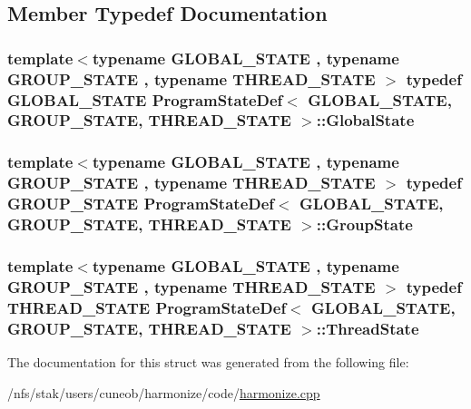\subsection{Member Typedef Documentation}
\hypertarget{structProgramStateDef_a8f9d3005b6690c9ed965e42d5c5bb21f}{
\subsubsection[{Global\-State}]{\setlength{\rightskip}{0pt plus 5cm}template$<$typename G\-L\-O\-B\-A\-L\-\_\-\-S\-T\-A\-T\-E , typename G\-R\-O\-U\-P\-\_\-\-S\-T\-A\-T\-E , typename T\-H\-R\-E\-A\-D\-\_\-\-S\-T\-A\-T\-E $>$ typedef G\-L\-O\-B\-A\-L\-\_\-\-S\-T\-A\-T\-E {\bf Program\-State\-Def}$<$ G\-L\-O\-B\-A\-L\-\_\-\-S\-T\-A\-T\-E, G\-R\-O\-U\-P\-\_\-\-S\-T\-A\-T\-E, T\-H\-R\-E\-A\-D\-\_\-\-S\-T\-A\-T\-E $>$\-::{\bf Global\-State}}}\label{structProgramStateDef_a8f9d3005b6690c9ed965e42d5c5bb21f}
\hypertarget{structProgramStateDef_aa781f95a1fadd73f9a9fc4acbff8c318}{
\subsubsection[{Group\-State}]{\setlength{\rightskip}{0pt plus 5cm}template$<$typename G\-L\-O\-B\-A\-L\-\_\-\-S\-T\-A\-T\-E , typename G\-R\-O\-U\-P\-\_\-\-S\-T\-A\-T\-E , typename T\-H\-R\-E\-A\-D\-\_\-\-S\-T\-A\-T\-E $>$ typedef G\-R\-O\-U\-P\-\_\-\-S\-T\-A\-T\-E {\bf Program\-State\-Def}$<$ G\-L\-O\-B\-A\-L\-\_\-\-S\-T\-A\-T\-E, G\-R\-O\-U\-P\-\_\-\-S\-T\-A\-T\-E, T\-H\-R\-E\-A\-D\-\_\-\-S\-T\-A\-T\-E $>$\-::{\bf Group\-State}}}\label{structProgramStateDef_aa781f95a1fadd73f9a9fc4acbff8c318}
\hypertarget{structProgramStateDef_aaa5eb80e26181e84845c4aefd5819ee6}{
\subsubsection[{Thread\-State}]{\setlength{\rightskip}{0pt plus 5cm}template$<$typename G\-L\-O\-B\-A\-L\-\_\-\-S\-T\-A\-T\-E , typename G\-R\-O\-U\-P\-\_\-\-S\-T\-A\-T\-E , typename T\-H\-R\-E\-A\-D\-\_\-\-S\-T\-A\-T\-E $>$ typedef T\-H\-R\-E\-A\-D\-\_\-\-S\-T\-A\-T\-E {\bf Program\-State\-Def}$<$ G\-L\-O\-B\-A\-L\-\_\-\-S\-T\-A\-T\-E, G\-R\-O\-U\-P\-\_\-\-S\-T\-A\-T\-E, T\-H\-R\-E\-A\-D\-\_\-\-S\-T\-A\-T\-E $>$\-::{\bf Thread\-State}}}\label{structProgramStateDef_aaa5eb80e26181e84845c4aefd5819ee6}


The documentation for this struct was generated from the following file\-:\begin{DoxyCompactItemize}
\item 
/nfs/stak/users/cuneob/harmonize/code/\hyperlink{harmonize_8cpp}{harmonize.\-cpp}\end{DoxyCompactItemize}
